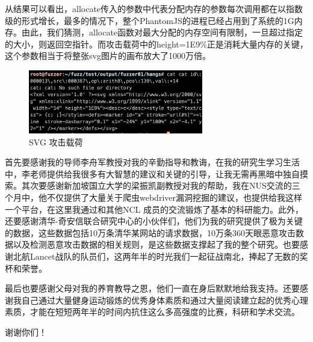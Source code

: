 \documentclass[doctor,privacy,twoside]{buaa_mac}
\begin{document}
  
从结果可以看出，allocate传入的参数中代表分配内存的参数每次调用都在以指数级的形式增长，最多的情况下，整个PhantomJS的进程已经占用到了系统的1G内存。由此，我们猜测，allocate函数对最大分配的内存空间有限制，一旦超过指定的大小，则返回空指针。而攻击载荷中的height=1E9\%正是消耗大量内存的关键，这个参数相当于将整张svg图片的画布放大了1000万倍。

  \centerline{}
\begin{figure}[!h]
  \centering
  \includegraphics[width=0.68\textwidth]{images/svg_payload.png}
  \caption{SVG 攻击载荷}
  \label{fig:logo}
\end{figure}
\centerline{}




\achievement


\acknowledgments

首先要感谢我的导师李舟军教授对我的辛勤指导和教诲，在我的研究生学习生活中，李老师提供给我很多有大智慧的建议和关键的引导，让我无需再黑暗中独自摸索。其次要感谢新加坡国立大学的梁振凯副教授对我的帮助，我在NUS交流的三个月中，他不仅提供了大量关于爬虫webdriver漏洞挖掘的建议，也提供给我这样一个平台，在这里我通过和其他NCL 成员的交流锻炼了基本的科研能力。此外，还要感谢清华-奇安信联合研究中心的小伙伴们，他们为我的研究提供了极为关键的数据，这些数据包括10万条清华某网站的请求数据，10万条360天眼恶意攻击数据以及检测恶意攻击数据的相关规则，是这些数据支撑起了我的整个研究。也要感谢北航Lancet战队的队员们，这两年半的时光我们一起征战南北，捧起了无数的奖杯和荣誉。

最后也要感谢父母对我的养育教导之恩，他们一直在身后默默地给我支持。还要感谢我自己通过大量健身运动锻炼的优秀身体素质和通过大量阅读建立起的优秀心理素质，才能在短短两年半的时间内抗住这么多高强度的比赛，科研和学术交流。

谢谢你们！


%

%

\vspace{5cm}
\end{document}
